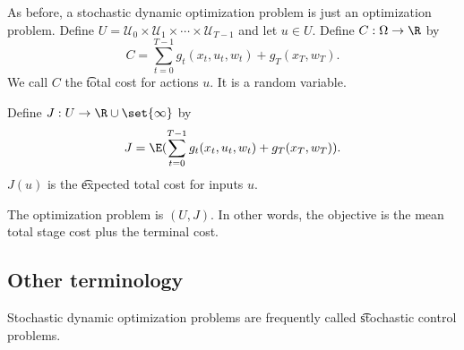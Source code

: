As before, a stochastic dynamic optimization problem is just an optimization problem.
Define $U = \mathcal{U} _0 \times  \mathcal{U} _1 \times  \cdots \times  \mathcal{U} _{T-1}$ and let $u \in U$.
Define $C: \Omega  \to \R $ by
\[
C = \sum_{t = 0}^{T-1} g_t(x_t, u_t, w_t) + g_T(x_T, w_T).
\]
We call $C$ the \t{total cost} for actions $u$.
It is a random variable.

Define $J: U \to \R  \cup \set{\infty}$ by
\[
J = \E (
\sum_{t = 0}^{T-1} g_t(x_t, u_t, w_t) + g_T(x_T, w_T)
).
\]
$J(u)$ is the \t{expected total cost} for inputs $u$.

The optimization problem is $(U, J)$.
In other words, the objective is the mean total stage cost plus the terminal cost.

\subsection*{Other terminology}

Stochastic dynamic optimization problems are frequently called \t{stochastic control problems}.
